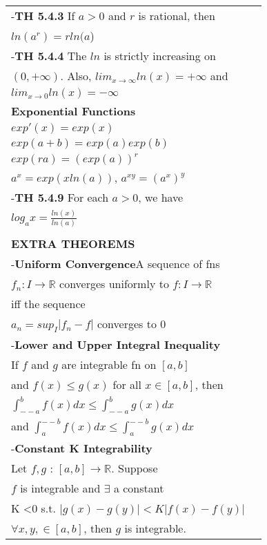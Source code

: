 \documentclass[10 pt,landscape]{article}
\begin{document}
\begin{multicols}{4}
\begin{tabular}{@{}ll@{}}
-\textbf{TH 5.4.3} If $a>0$ and $r$ is rational, then\\ $ln(a^r)=rln(a$)\\
-\textbf{TH 5.4.4} The $ln$ is strictly increasing on\\ $(0, +\infty)$. Also, $lim_{x \to \infty}ln(x)=+\infty$ and\\ $lim_{x \to 0}ln(x)=-\infty$\\
\textbf{Exponential Functions} \\$exp'(x)=exp(x)$\\$exp(a+b)=exp(a)exp(b)$\\$exp(ra)=(exp(a))^r$\\
$a^x=exp(xln(a))$, $a^{xy}=(a^x)^y$\\
-\textbf{TH 5.4.9} For each $a>0$, we have \\ $log_ax=\frac{ln(x)}{ln(a)}$
\\
\\
\textbf{EXTRA THEOREMS}\\
-\textbf{Uniform Convergence}A sequence of fns\\ $f_n:I \to \mathbb{R}$ converges uniformly to $f:I \to \mathbb{R}$\\ iff the sequence\\ $a_n=sup_I|f_n-f|$ converges to $0$\\
-\textbf{Lower and Upper Integral Inequality} \\If $f$ and $g$ are integrable fn on $[a,b]$\\ and $f(x) \leq g(x)$ for all $x \in [a,b]$, then\\ $\int_{--a}^{b}f(x)dx \leq \int_{--a}^{b}g(x)dx$\\ and $\int_{a}^{--b}f(x)dx \leq \int_{a}^{--b}g(x)dx$\\
-\textbf{Constant K Integrability}\\Let $f,g$ : $[a,b] \to \mathbb{R}$.  Suppose\\ $f$ is integrable and $\exists$ a constant \\K \textless  0 s.t. $|g(x)-g(y)|< K|f(x)-f(y)|$\\ $\forall x,y,\in [a,b]$, then $g$ is integrable.

\end{tabular}


\end{multicols}
\end{document}
